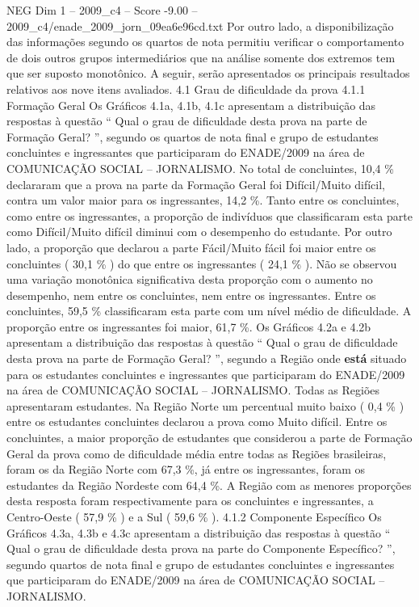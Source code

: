 \begin{textsample}{NEG Dim 1 – 2009\_c4 – Score -9.00 – 2009\_c4/enade\_2009\_jorn\_09ea6e96cd.txt}
Por outro lado, a disponibilização das informações segundo os quartos de nota permitiu verificar o comportamento de dois outros grupos intermediários que na análise somente dos extremos tem que ser suposto monotônico.
A seguir, serão apresentados os principais resultados relativos aos nove itens avaliados. 4.1 Grau de dificuldade da prova 4.1.1 Formação Geral Os Gráficos 4.1a, 4.1b, 4.1c apresentam a distribuição das respostas à questão “ Qual o grau de dificuldade desta prova na parte de Formação Geral? ”, segundo os quartos de nota final e grupo de estudantes concluintes e ingressantes que participaram do ENADE/2009 na área de COMUNICAÇÃO SOCIAL – JORNALISMO.
No total de concluintes, 10,4 \% declararam que a prova na parte da Formação Geral foi Difícil/Muito difícil, contra um valor maior para os ingressantes, 14,2 \%.
Tanto entre os concluintes, como entre os ingressantes, a proporção de indivíduos que classificaram esta parte como Difícil/Muito difícil diminui com o desempenho do estudante.
Por outro lado, a proporção que declarou a parte Fácil/Muito fácil foi maior entre os concluintes ( 30,1 \% ) do que entre os ingressantes ( 24,1 \% ).
Não se observou uma variação monotônica significativa desta proporção com o aumento no desempenho, nem entre os concluintes, nem entre os ingressantes.
Entre os concluintes, 59,5 \% classificaram esta parte com um nível médio de dificuldade.
A proporção entre os ingressantes foi maior, 61,7 \%.
Os Gráficos 4.2a e 4.2b apresentam a distribuição das respostas à questão “ Qual o grau de dificuldade desta prova na parte de Formação Geral? ”, segundo a Região onde \textbf{está} situado para os estudantes concluintes e ingressantes que participaram do ENADE/2009 na área de COMUNICAÇÃO SOCIAL – JORNALISMO.
Todas as Regiões apresentaram estudantes.
Na Região Norte um percentual muito baixo ( 0,4 \% ) entre os estudantes concluintes declarou a prova como Muito difícil.
Entre os concluintes, a maior proporção de estudantes que considerou a parte de Formação Geral da prova como de dificuldade média entre todas as Regiões brasileiras, foram os da Região Norte com 67,3 \%, já entre os ingressantes, foram os estudantes da Região Nordeste com 64,4 \%.
A Região com as menores proporções desta resposta foram respectivamente para os concluintes e ingressantes, a Centro-Oeste ( 57,9 \% ) e a Sul ( 59,6 \% ). 4.1.2 Componente Específico Os Gráficos 4.3a, 4.3b e 4.3c apresentam a distribuição das respostas à questão “ Qual o grau de dificuldade desta prova na parte do Componente Específico? ”, segundo quartos de nota final e grupo de estudantes concluintes e ingressantes que participaram do ENADE/2009 na área de COMUNICAÇÃO SOCIAL – JORNALISMO.

\end{textsample}
